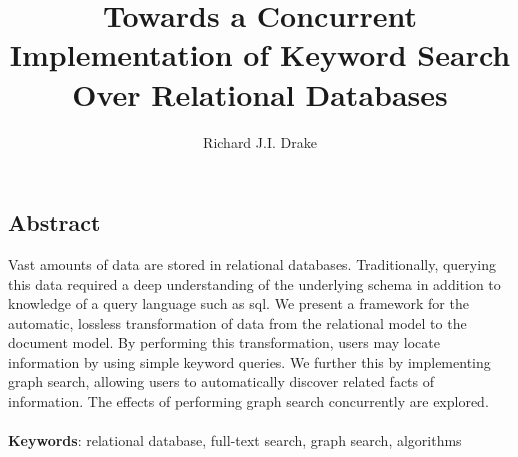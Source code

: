 \documentclass[grad,openright]{uoit-thesis}
\author{Richard J.I. Drake}
\title{Towards a Concurrent Implementation of Keyword Search Over Relational Databases}
\begin{document}
	
	
	
	\begin{preliminary}
		\maketitle

		\setcounter{page}{3}
		
		\chapter*{Abstract}
			Vast amounts of data are stored in relational databases.  Traditionally, querying this data required a deep understanding of the underlying schema in addition to knowledge of a query language such as \gls{sql}.  We present a framework for the automatic, lossless transformation of data from the relational model to the document model.    By performing this transformation, users may locate information by using simple keyword queries.  We further this by implementing graph search, allowing users to automatically discover related facts of information.  The effects of performing graph search concurrently are explored.
			\\ \\
			\textbf{Keywords}:  relational database, full-text search, graph search, algorithms

		\tableofcontents
		
		\listoftables
		
		\listoffigures
		
		\listofalgorithms
		
		\printglossaries
	\end{preliminary}
	
	
	
	
	
	
	
	
	
	
	

	\appendix
	
	\begin{singlespaced}
		
	\end{singlespaced}
	
	
	
	\printbibliography
\end{document}
